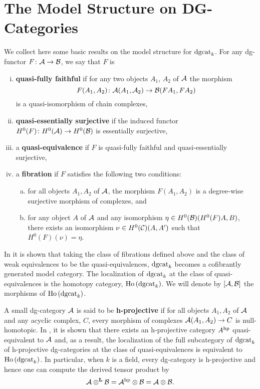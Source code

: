 \section{The Model Structure on DG-Categories}
We collect here some basic results on the model structure for \(\operatorname{dgcat}_k\).
For any dg-functor \(F \colon \mathcal{A} \to \mathcal{B}\), we say that \(F\) is
\begin{enumerate}[(i)]
\item
  \textbf{quasi-fully faithful} if for any two objects \(A_1\), \(A_2\) of \(\mathcal{A}\) the morphism
  \[F(A_1, A_2) \colon \mathcal{A}(A_1, \mathcal{A}_2) \to \mathcal{B}(FA_1, FA_2)\]
  is a quasi-isomorphism of chain complexes,
\item
  \textbf{quasi-essentially surjective} if the induced functor \(H^0(F) \colon H^0(\mathcal{A}) \to H^0(\mathcal{B})\) is essentially surjective,
\item
  a \textbf{quasi-equivalence} if \(F\) is quasi-fully faithful and quasi-essentially surjective,
\item
  a \textbf{fibration} if \(F\) satisfies the following two conditions:
  \begin{enumerate}[(a)]
  \item
    for all objects \(A_1, A_2\) of \(\mathcal{A}\), the morphism \(F(A_1,A_2)\) is a degree-wise surjective morphism of complexes, and
  \item
    for any object \(A\) of \(\mathcal{A}\) and any isomorphism \(\eta \in H^0(\mathcal{B})(H^0(F)A, B)\), there exists an isomorphism \(\nu \in H^0(\mathcal{C})(A,A^\prime)\) such that \(H^0(F)(\nu) = \eta\).
  \end{enumerate}
\end{enumerate}
In \cite{Tabuada05} it is shown that taking the class of fibrations defined above and the class of weak equivalences to be the quasi-equivalences, \(\operatorname{dgcat}_k\) becomes a cofibrantly generated model category.
The localization of \(\operatorname{dgcat}_k\) at the class of quasi-equivalences is the homotopy category, \(\operatorname{Ho}\left(\operatorname{dgcat}_k\right)\).
We will denote by \([\mathcal{A},\mathcal{B}]\) the morphisms of \(\operatorname{Ho}\left(\operatorname{dgcat}_k\right)\).

A small dg-category \(\mathcal{A}\) is said to be \textbf{h-projective} if for all objects \(A_1, A_2\) of \(\mathcal{A}\) and any acyclic complex, \(C\), every morphism of complexes \(\mathcal{A}(A_1, A_2) \to C\) is null-homotopic.
In \cite{CS15}, it is shown that there exists an h-projective category \(A^{\operatorname{hp}}\) quasi-equivalent to \(\mathcal{A}\) and, as a result, the localization of the full subcategory of \(\operatorname{dgcat}_k\) of h-projective dg-categories at the class of quasi-equivalences is equivalent to \(\operatorname{Ho}\left(\operatorname{dgcat}_k\right)\).
In particular, when \(k\) is a field, every dg-category is h-projective and hence one can compute the derived tensor product by
\[\mathcal{A} \otimes^\mathbf{L} \mathcal{B} = \mathcal{A}^{\operatorname{hp}} \otimes \mathcal{B} = \mathcal{A} \otimes \mathcal{B}.\]

